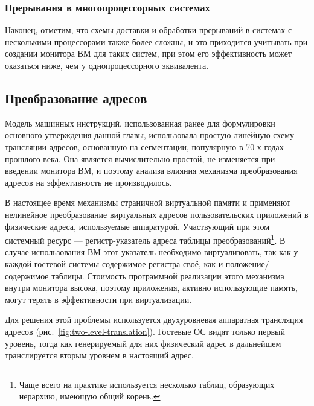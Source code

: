 \subsubsection{Прерывания в многопроцессорных системах}

Наконец, отметим, что схемы доставки и обработки прерываний в системах с несколькими процессорами также более сложны, и это приходится учитывать при создании монитора ВМ для таких систем, при этом его эффективность может оказаться ниже, чем у однопроцессорного эквивалента. 

\subsection{Преобразование адресов}

Модель машинных инструкций, использованная ранее для формулировки основного утверждения данной главы, использовала простую линейную схему трансляции адресов, основанную на сегментации, популярную в 70-х годах прошлого века. Она является вычислительно простой, не изменяется при введении монитора ВМ, и поэтому анализа влияния механизма преобразования адресов на эффективность не производилось.

В настоящее время механизмы страничной виртуальной памяти и применяют нелинейное преобразование виртуальных адресов пользовательских приложений в физические адреса, используемые аппаратурой. Участвующий при этом системный ресурс --- регистр-указатель адреса таблицы преобразований\footnote{Чаще всего на практике используется несколько таблиц, образующих иерархию, имеющую общий корень.}. В случае использования ВМ этот указатель необходимо виртуализовать, так как у каждой гостевой системы содержимое регистра своё, как и положение/содержимое таблицы. Стоимость программной реализации этого механизма внутри монитора высока, поэтому приложения, активно использующие память, могут терять в эффективности при виртуализации.

Для решения этой проблемы используется двухуровневая аппаратная трансляция адресов (рис.~\ref{fig:two-level-translation}). Гостевые ОС видят только первый уровень, тогда как генерируемый для них физический адрес в дальнейшем транслируется вторым уровнем в настоящий адрес.

